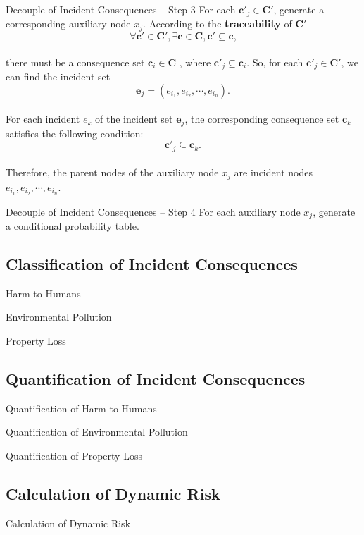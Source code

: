 \begin{frame}{Decouple of Incident Consequences -- Step 3}
     For each $\bm{c}'_j \in \bm{C}'$, generate a corresponding auxiliary node $x_j$. According to the \textbf{traceability} of $\bm{C}'$
     \[
        \forall \bm{c}' \in \bm{C}', \exists \bm{c} \in \bm{C}, \bm{c}' \subseteq \bm{c}\text{,}
     \]
     \vspace{-15pt}\\
     there must be a consequence set $\bm{c}_i \in \bm{C}$ , where $\bm{c}'_j \subseteq \bm{c}_i$. \pause So, for each $\bm{c}'_j \in \bm{C}'$, we can find the incident set
     \[
        \bm{e}_j = (e_{i_1},e_{i_2},\cdots,e_{i_n})\text{.}
     \]
     \vspace{-15pt}\\\pause
     For each incident $e_k$ of the incident set $\bm{e}_j$, the corresponding consequence set $\bm{c}_k$ satisfies the following condition:
     \[
        \bm{c}'_j \subseteq \bm{c}_k\text{.}
     \]
     \vspace{-15pt}\\\pause
     Therefore, the parent nodes of the auxiliary node $x_j$ are incident nodes $e_{i_1},e_{i_2},\cdots,e_{i_n}$.
\end{frame}

\begin{frame}{Decouple of Incident Consequences -- Step 4}
    For each auxiliary node $x_j$, generate a conditional probability table.
    
    
    
    
\end{frame}

\subsection{Classification of Incident Consequences}
\begin{frame}{Harm to Humans}
\end{frame}

\begin{frame}{Environmental Pollution}
\end{frame}

\begin{frame}{Property Loss}
\end{frame}

\subsection{Quantification of Incident Consequences}
\begin{frame}{Quantification of Harm to Humans}
\end{frame}

\begin{frame}{Quantification of Environmental Pollution}
\end{frame}

\begin{frame}{Quantification of Property Loss}
\end{frame}

\subsection{Calculation of Dynamic Risk}
\begin{frame}{Calculation of Dynamic Risk}
\end{frame} 